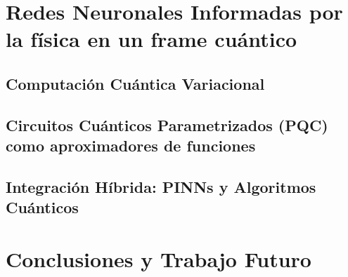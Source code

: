 \documentclass[12pt,letterpaper,twoside]{book}
\begin{document}
\chapter{Redes Neuronales Informadas por la física en un frame cuántico}\label{ch:quantum}
\section{Computación Cuántica Variacional}
\section{Circuitos Cuánticos Parametrizados (PQC) como aproximadores de funciones}
\section{Integración Híbrida: PINNs y Algoritmos Cuánticos}

\chapter{Conclusiones y Trabajo Futuro}

\appendix
\end{document}
